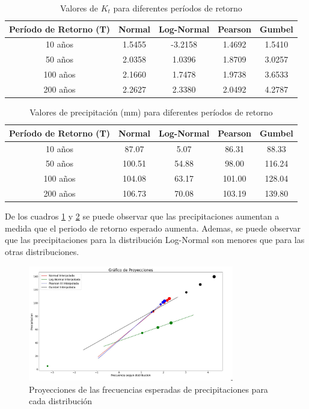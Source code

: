 \documentclass{article}  %
\begin{document}
\begin{table}[H]
  \centering
  \caption{Valores de \( K_t \) para diferentes períodos de retorno}
  \vspace{0.2cm}
  \begin{tabular}{|c|c|c|c|c|}
  \hline
  \textbf{Período de Retorno (T)} & \textbf{Normal} & \textbf{Log-Normal} & \textbf{Pearson} & \textbf{Gumbel} \\ \hline
  10 años  & 1.5455 & -3.2158 & 1.4692 & 1.5410 \\ \hline
  50 años  & 2.0358 & 1.0396 & 1.8709 & 3.0257 \\ \hline
  100 años & 2.1660 & 1.7478 & 1.9738 & 3.6533 \\ \hline
  200 años & 2.2627 & 2.3380 & 2.0492 & 4.2787 \\ \hline
  \end{tabular}
  \label{table:kt}
\end{table}

\begin{table}[H]
  \centering
  \caption{Valores de precipitación (mm) para diferentes períodos de retorno}
  \vspace{0.2cm}
  \begin{tabular}{|c|c|c|c|c|}
  \hline
  \textbf{Período de Retorno (T)} & \textbf{Normal} & \textbf{Log-Normal} & \textbf{Pearson} & \textbf{Gumbel} \\ \hline
  10 años  & 87.07 & 5.07 & 86.31 & 88.33 \\ \hline
  50 años  & 100.51 & 54.88 & 98.00 & 116.24 \\ \hline
  100 años & 104.08 & 63.17 & 101.00 & 128.04 \\ \hline
  200 años & 106.73 & 70.08 & 103.19 & 139.80 \\ \hline
  \end{tabular}
  \label{table:precipitacion}
\end{table}

De los cuadros \ref{table:kt} y \ref{table:precipitacion} se puede observar que las precipitaciones aumentan a medida que el periodo de retorno esperado aumenta. Ademas, se puede observar que las precipitaciones para la distribución Log-Normal son menores que para las otras distribuciones.

\begin{figure}[H]
  \centering
  \includegraphics[width=0.8\textwidth]{grafico_proyecciones.jpg}
  \caption{Proyecciones de las frecuencias esperadas de precipitaciones para cada distribución}
  \label{fig:grafico_proyecciones}
\end{figure}
\end{document}
